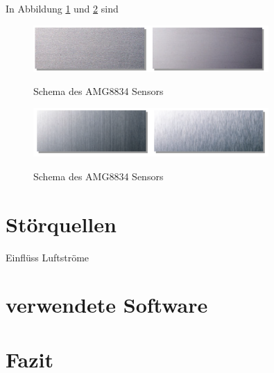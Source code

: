 In Abbildung \ref{fig:Edelstahlgewalzt} und \ref{fig:Edelstahlmatt} sind 
\begin{figure}[H]
	\centering
	\includegraphics[width=0.8\textwidth]
	{fig/Edelstahl_gewalzt.PNG}
	\caption[Schema des AMG8834 Sensors]{Schema des AMG8834 Sensors} \protect\cite{Edelstahl}
	\label{fig:Edelstahlgewalzt}
\end{figure}


\begin{figure}[H]
	\centering
	\includegraphics[width=0.8\textwidth]
	{fig/Edelstahl_matt.PNG}
	\caption[Schema des AMG8834 Sensors]{Schema des AMG8834 Sensors} \protect\cite{Edelstahl}
	\label{fig:Edelstahlmatt}
	
	
\end{figure}

\section{Störquellen}

Einflüss Luftströme





\section{verwendete Software}



\section{Fazit}

